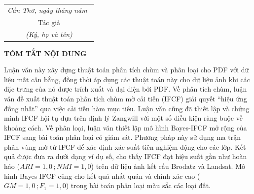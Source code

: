 \hspace*{\fill}
\begin{tabular}{@{}c@{}} 
	\\\it 
	Cần Thơ, ngày \quad tháng \quad năm \qquad\,\\
	Tác giả\\
	\textit{(Ký, họ và tên)}
	
\end{tabular}

\newpage
\begin{center}
		\vspace*{50pt} %
	{\fontsize{14}{0pt}\selectfont\bf TÓM TẮT NỘI DUNG}
\end{center}
\vspace{20pt}
Luận văn này xây dựng thuật toán phân tích chùm và
phân loại cho PDF với dữ liệu mất cân bằng, đồng thời áp dụng các thuật toán này cho
dữ liệu ảnh khi các đặc trưng của nó được trích xuất và đại diện bởi PDF. Về phân tích
chùm, luận văn đề xuất thuật toán phân tích chùm mờ cải tiến (IFCF) giải quyết “hiệu
ứng đồng nhất” qua việc cải tiến hàm mục tiêu. Luận văn cũng đã thiết lập và chứng
minh IFCF hội tụ dựa trên định lý Zangwill với một số điều kiện ràng buộc về khoảng
cách. Về phân loại, luận văn thiết lập mô hình Bayes-IFCF mở rộng của IFCF sang bài
toán phân loại có giám sát. Phương pháp này sử dụng ma trận phân vùng mờ từ IFCF để
xác định xác suất tiên nghiệm động cho các lớp. Kết quả được đưa ra dưới dạng ví dụ
số, cho thấy IFCF đạt hiệu suất gần như hoàn hảo ($ARI = 1{,}0\,; NMI = 1{,}0$) trên dữ
liệu ảnh kết cấu Brodatz và Landsat. Mô hình Bayes-IFCF cũng cho kết quả nhất quán
và chính xác cao ($GM = 1{,}0\,; F_1 = 1{,}0$) trong bài toán phân loại màu sắc
các loại đất.

